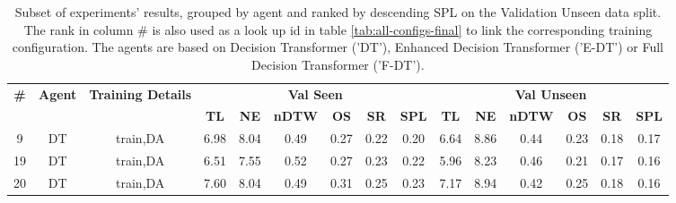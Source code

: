 \begin{table}
\centering
\caption{\label{tab:dagger_pe_oa}Subset of experiments' results, grouped by agent and ranked by descending SPL on the Validation Unseen data split. The rank in column \# is also used as a look up id in table \ref{tab:all-configs-final} to link the corresponding training configuration.     \newline The agents are based on Decision Transformer ('DT'), Enhanced Decision Transformer ('E-DT') or Full Decision Transformer ('F-DT').}
\begin{tabular}{@{\hskip3pt}c@{\hskip3pt}c@{\hskip3pt}c@{\hskip3pt}c@{\hskip3pt}c@{\hskip3pt}c@{\hskip3pt}c@{\hskip3pt}c@{\hskip3pt}c@{\hskip3pt}c@{\hskip3pt}c@{\hskip3pt}c@{\hskip3pt}c@{\hskip3pt}c@{\hskip3pt}c}
\toprule
\textbf{\#} & \textbf{Agent} & \textbf{Training Details} & \multicolumn{6}{c}{\textbf{Val Seen}} & \multicolumn{6}{c}{\textbf{Val Unseen}} \\
 \textbf{~} &     \textbf{~} &                \textbf{~} &       \textbf{TL} & \textbf{NE} & \textbf{nDTW} & \textbf{OS} & \textbf{SR} & \textbf{SPL} &         \textbf{TL} & \textbf{NE} & \textbf{nDTW} & \textbf{OS} & \textbf{SR} & \textbf{SPL} \\
\midrule
          9 &             DT &                  train,DA &              6.98 &        8.04 &          0.49 &        0.27 &        0.22 &         0.20 &                6.64 &        8.86 &          0.44 &        0.23 &        0.18 &         0.17 \\
         19 &             DT &                  train,DA &              6.51 &        7.55 &          0.52 &        0.27 &        0.23 &         0.22 &                5.96 &        8.23 &          0.46 &        0.21 &        0.17 &         0.16 \\
         20 &             DT &                  train,DA &              7.60 &        8.04 &          0.49 &        0.31 &        0.25 &         0.23 &                7.17 &        8.94 &          0.42 &        0.25 &        0.18 &         0.16 \\
\bottomrule
\end{tabular}
\end{table}
